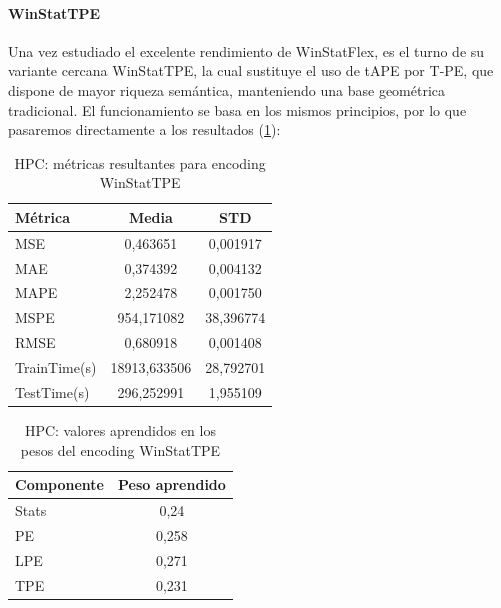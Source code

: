 \paragraph{WinStatTPE}

Una vez estudiado el excelente rendimiento de WinStatFlex, es el turno de su variante cercana WinStatTPE, la cual sustituye el uso de tAPE por T-PE, que dispone de mayor riqueza semántica, manteniendo una base geométrica tradicional. El funcionamiento se basa en los mismos principios, por lo que pasaremos directamente a los resultados (\ref{hpctpe}):
\begin{table}[!ht]
	\centering
	\begin{tabular}{l|c|c}
		\toprule
		Métrica & Media & STD \\
		\midrule
		MSE & 0,463651 & 0,001917 \\
		MAE & 0,374392 & 0,004132 \\
		MAPE & 2,252478 & 0,001750 \\
		MSPE & 954,171082 & 38,396774 \\
		RMSE & 0,680918 & 0,001408 \\
		TrainTime(s) & 18913,633506 & 28,792701 \\
		TestTime(s) & 296,252991 & 1,955109 \\
		\bottomrule
	\end{tabular}
	\caption{HPC: métricas resultantes para encoding WinStatTPE}
	\label{hpctpe}
\end{table}

\begin{table}[!ht]
	\centering
	\begin{tabular}{l|c}
		\toprule
		Componente & Peso aprendido \\
		\midrule
		Stats & 0,24 \\
		PE & 0,258 \\
		LPE & 0,271 \\
		TPE & 0,231 \\
		\bottomrule
	\end{tabular}
	\caption{HPC: valores aprendidos en los pesos del encoding WinStatTPE}
	\label{hpctpepesos}
\end{table}

